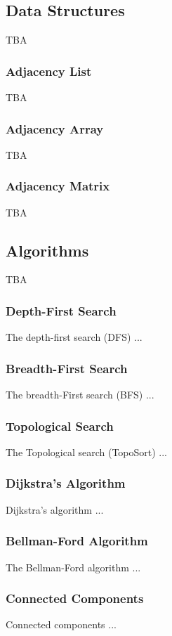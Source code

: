 \documentclass[10pt,onecolumn]{article}
\begin{document}
\subsection{Data Structures}
TBA

\subsubsection{Adjacency List}
TBA

\subsubsection{Adjacency Array}
TBA

\subsubsection{Adjacency Matrix}
TBA

\subsection{Algorithms}
TBA

\subsubsection{Depth-First Search}
The depth-first search \cite{REF_graph} (DFS) ...

\subsubsection{Breadth-First Search}
The breadth-First search \cite{REF_graph} (BFS) ...

\subsubsection{Topological Search}
The Topological search \cite{REF_} (TopoSort) ...

\subsubsection{Dijkstra's Algorithm}
Dijkstra's algorithm \cite{REF_} ...

\subsubsection{Bellman-Ford Algorithm}
The Bellman-Ford algorithm \cite{REF_} ...

\subsubsection{Connected Components}
Connected components \cite{REF_} ...
\end{document}
